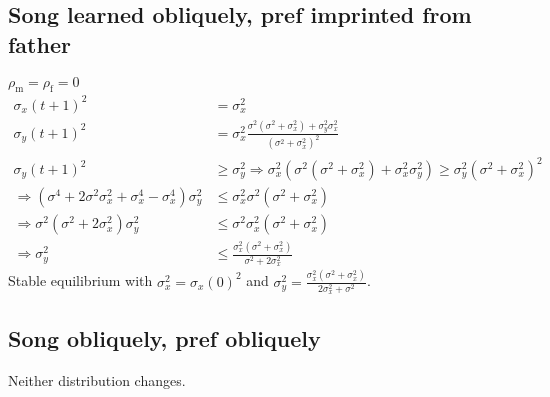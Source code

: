 \documentclass{article}
\newcommand{\x}[1]{\text{#1}}
\begin{document}
\begin{landscape}
\subsection{Song learned obliquely, pref imprinted from father }
$\rho_\x{m}=\rho_\x{f}=0$
\begin{align*}
\sigma_x(t+1)^2&=\sigma_x^2
\\ \sigma_y(t+1)^2&= \sigma_x^2\frac{\sigma^2(\sigma^2+\sigma_x^2)+\sigma_y^2\sigma_x^2}{(\sigma^2+\sigma_x^2)^2}
\\ \sigma_y(t+1)^2&\geq\sigma_y^2 \Rightarrow \sigma_x^2(\sigma^2(\sigma^2+\sigma_x^2)+\sigma_x^2\sigma_y^2)\geq\sigma_y^2(\sigma^2+\sigma_x^2)^2
\\ \Rightarrow \left(\sigma^4+2\sigma^2\sigma_x^2+\sigma_x^4-\sigma_x^4\right)\sigma_y^2&\leq\sigma_x^2\sigma^2(\sigma^2+\sigma_x^2)
\\ \Rightarrow \sigma^2(\sigma^2+2\sigma_x^2)\sigma_y^2&\leq\sigma^2\sigma_x^2(\sigma^2+\sigma_x^2)
\\ \Rightarrow \sigma_y^2&\leq\frac{\sigma_x^2(\sigma^2+\sigma_x^2)}{\sigma^2+2\sigma_x^2} 
\end{align*}
Stable equilibrium with $\sigma_x^2=\sigma_x(0)^2$ and $\sigma_y^2=\frac{\sigma_x^2(\sigma^2+\sigma_x^2)}{2\sigma_x^2+\sigma^2}$.
\subsection{Song obliquely, pref obliquely }
Neither distribution changes.

\end{landscape}
\end{document}
